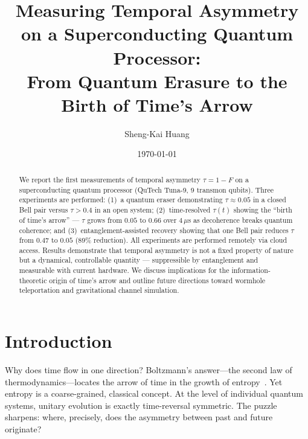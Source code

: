 \documentclass[prl,twocolumn,superscriptaddress,longbibliography,floatfix]{revtex4-2}
\newcommand{\tauasym}{\tau}
\begin{document}
\title{Measuring Temporal Asymmetry on a Superconducting Quantum Processor:\\
From Quantum Erasure to the Birth of Time's Arrow}

\author{Sheng-Kai Huang}

\date{\today}

\begin{abstract}
We report the first measurements of temporal asymmetry
$\tauasym = 1 - F$ on a superconducting quantum processor
(QuTech Tuna-9, 9 transmon qubits).  Three experiments are
performed: (1)~a quantum eraser demonstrating
$\tauasym \approx 0.05$ in a closed Bell pair versus
$\tauasym > 0.4$ in an open system; (2)~time-resolved
$\tauasym(t)$ showing the ``birth of time's arrow'' ---
$\tauasym$ grows from $0.05$ to $0.66$ over $4\,\mu$s as
decoherence breaks quantum coherence; and (3)~entanglement-assisted
recovery showing that one Bell pair reduces $\tauasym$ from
$0.47$ to $0.05$ (89\% reduction).  All experiments are performed
remotely via cloud access.  Results demonstrate that temporal
asymmetry is not a fixed property of nature but a dynamical,
controllable quantity --- suppressible by entanglement and
measurable with current hardware.  We discuss implications for the
information-theoretic origin of time's arrow and outline future
directions toward wormhole teleportation and gravitational channel
simulation.
\end{abstract}

\maketitle

\section{Introduction}
\label{sec:intro}

Why does time flow in one direction?  Boltzmann's answer---the
second law of thermodynamics---locates the arrow of time in the
growth of entropy~\cite{Boltzmann1877}.  Yet entropy is a
coarse-grained, classical concept.  At the level of individual
quantum systems, unitary evolution is exactly time-reversal
symmetric.  The puzzle sharpens: where, precisely, does the
asymmetry between past and future originate?
\end{document}
